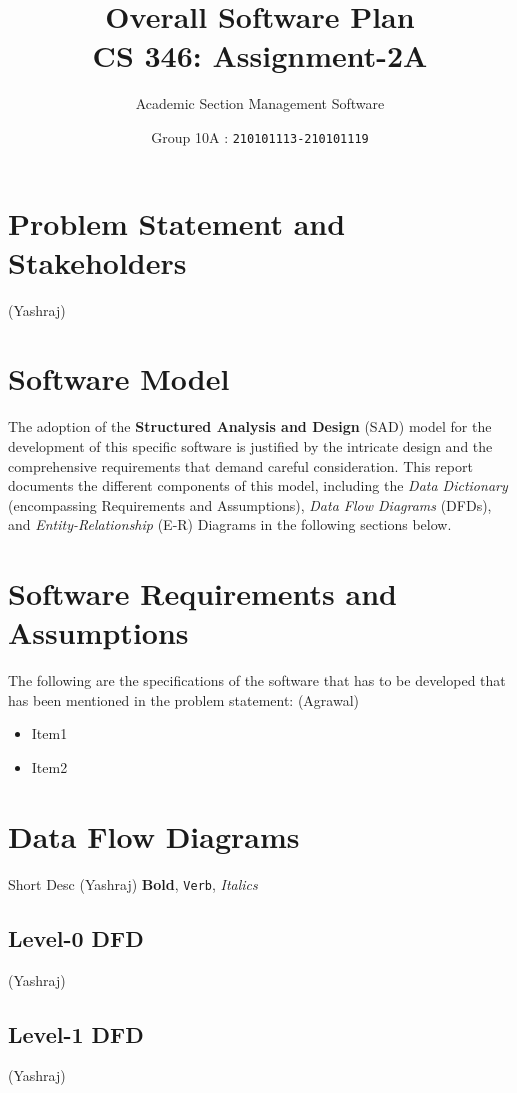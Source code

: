 \documentclass[12pt,a4paper]{article}
\begin{document}
\title{\huge \textbf{Overall Software Plan} \\ \LARGE {\textbf{CS 346: Assignment-2A}}}
\author{\Large Academic Section Management Software}
\date{Group 10A : \texttt{210101113-210101119}}
\maketitle


\section{Problem Statement and Stakeholders}
(Yashraj)

\section{Software Model}
The adoption of the \textbf{Structured Analysis and Design} (SAD) model for the development of this specific software is justified by the intricate design and the comprehensive requirements that demand careful consideration. This report documents the different components of this model, including the \textit{Data Dictionary} (encompassing Requirements and Assumptions), \textit{Data Flow Diagrams} (DFDs), and \textit{Entity-Relationship} (E-R) Diagrams in the following sections below.
    
\section{Software Requirements and Assumptions}
The following are the specifications of the software that has to be developed that has been mentioned in the problem statement: (Agrawal)
\begin{itemize}
    \item Item1
    \item Item2
\end{itemize}

\section{Data Flow Diagrams}
Short Desc (Yashraj) \textbf{Bold}, \texttt{Verb}, \textit{Italics}
\subsection{Level-0 DFD}
(Yashraj)
\subsection{Level-1 DFD}
(Yashraj)
\end{document}
